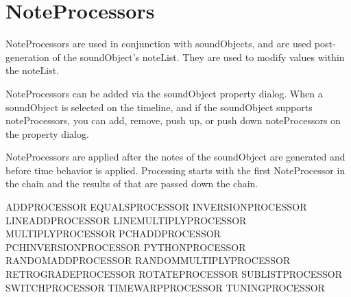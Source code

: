 \section{NoteProcessors}\label{noteProcessors}

NoteProcessors are used in conjunction with soundObjects, and are used
post-generation of the soundObject's noteList. They are used to modify
values within the noteList.

NoteProcessors can be added via the soundObject property dialog. When a
soundObject is selected on the timeline, and if the soundObject supports
noteProcessors, you can add, remove, push up, or push down
noteProcessors on the property dialog.

NoteProcessors are applied after the notes of the soundObject are
generated and before time behavior is applied. Processing starts with
the first NoteProcessor in the chain and the results of that are passed
down the chain.

ADDPROCESSOR EQUALSPROCESSOR INVERSIONPROCESSOR LINEADDPROCESSOR
LINEMULTIPLYPROCESSOR MULTIPLYPROCESSOR PCHADDPROCESSOR
PCHINVERSIONPROCESSOR PYTHONPROCESSOR RANDOMADDPROCESSOR
RANDOMMULTIPLYPROCESSOR RETROGRADEPROCESSOR ROTATEPROCESSOR
SUBLISTPROCESSOR SWITCHPROCESSOR TIMEWARPPROCESSOR TUNINGPROCESSOR
